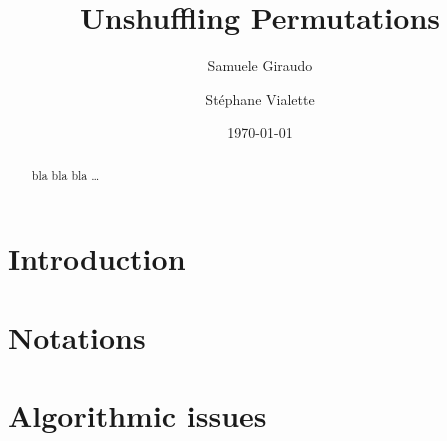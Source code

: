 \documentclass[a4paper,10pt]{llncs}
\begin{document}

\title{%
Unshuffling Permutations}%

\author{%
  Samuele Giraudo \and
  St\'ephane Vialette
}%
\date{\today}

\maketitle


\begin{abstract}
bla bla bla \ldots
\end{abstract}


\section{Introduction}
\label{section:Introduction}



\section{Notations}
\label{section:Notations}



\section{Algorithmic issues}
\label{section:Algorithmic issues}

\newcommand\INCREASING[1]{%
  \begin{tikzpicture}[>=latex]
  \draw [->] (0,0) -- node[midway,below] {$#1$} -- ++ (1,1);
  \end{tikzpicture}
}
\end{document}

